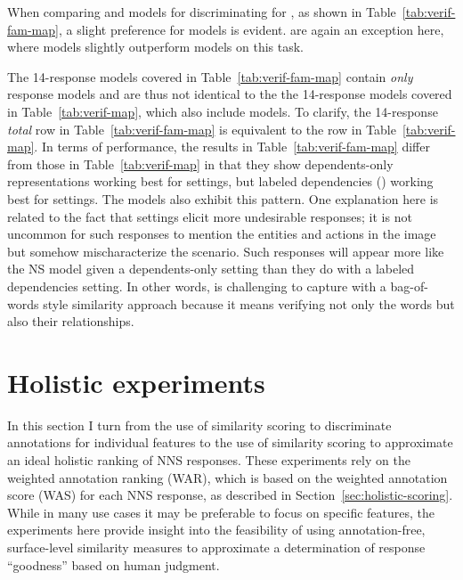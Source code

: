 When comparing  and  models for discriminating for , as shown in Table~\ref{tab:verif-fam-map}, a slight preference for  models is evident.  are again an exception here, where  models slightly outperform  models on this task.

The  14-response models covered in Table~\ref{tab:verif-fam-map} contain \textit{only}  response models and are thus not identical to the the  14-response models covered in Table~\ref{tab:verif-map}, which also include  models. To clarify, the  14-response \textit{total} row in Table~\ref{tab:verif-fam-map} is equivalent to the  row in Table~\ref{tab:verif-map}. In terms of performance, the  results in Table~\ref{tab:verif-fam-map} differ from those in Table~\ref{tab:verif-map} in that they show dependents-only representations working best for  settings, but labeled dependencies () working best for  settings. The  models also exhibit this pattern. One explanation here is related to the fact that   settings elicit more undesirable responses; it is not uncommon for such responses to mention the entities and actions in the image but somehow mischaracterize the scenario. Such responses will appear more like the NS model given a dependents-only setting than they do with a labeled dependencies setting. In other words,  is challenging to capture with a bag-of-words style similarity approach because it means verifying not only the words but also their relationships.


\section{Holistic experiments}
\label{sec:exp-holistic}
In this section I turn from the use of similarity scoring to discriminate annotations for individual features to the use of similarity scoring to approximate an ideal holistic ranking of NNS responses. These experiments rely on the weighted annotation ranking (WAR), which is based on the weighted annotation score (WAS) for each NNS response, as described in Section~\ref{sec:holistic-scoring}. While in many use cases it may be preferable to focus on specific features, the experiments here provide insight into the feasibility of using annotation-free, surface-level similarity measures to approximate a determination of response ``goodness'' based on human judgment.

